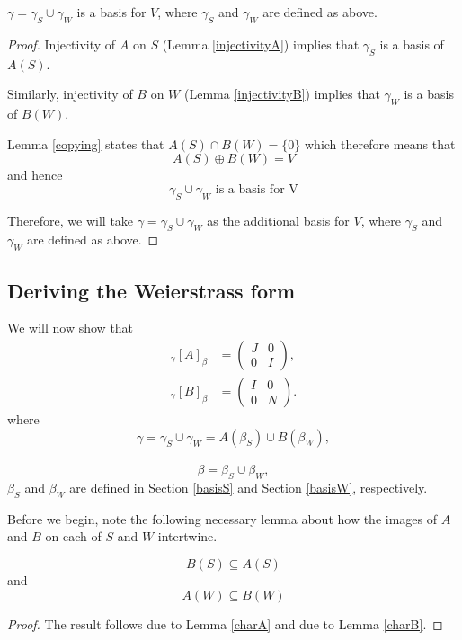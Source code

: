 \begin{lemma}
    $\gamma=\gamma_S\cup \gamma_W$ is a basis for $V$, where  $\gamma_S$ and $\gamma_W$ are defined as above.
\end{lemma}
\begin{proof}
    Injectivity of $A$ on $S$ (Lemma \ref{injectivityA}) implies that $\gamma_S$ is a basis of $A(S)$.
    
    Similarly, injectivity of $B$ on $W$ (Lemma \ref{injectivityB}) implies that $\gamma_W$ is a basis of $B(W)$.
    
    Lemma \ref{copying} states that $A(S)\cap B(W)=\{0\}$ which therefore means that $$A(S)\oplus B(W)=V$$and hence $$\gamma_S\cup \gamma_W\text{ is a basis for V}$$

Therefore, we will take $\gamma=\gamma_S\cup \gamma_W$ as the additional basis for $V$, where $\gamma_S$ and $\gamma_W$ are defined as above.

    

\end{proof}
\subsection{Deriving the Weierstrass form}
We will now show that
\begin{equation}\label{weierstrass}
\begin{aligned}
{}_{\gamma}[A]_{\beta}
&=
\begin{pmatrix}
J & 0\\
0 & I
\end{pmatrix},
\\[1em]
{}_{\gamma}[B]_{\beta}
&=
\begin{pmatrix}
I & 0\\
0 & N
\end{pmatrix}.
\end{aligned}
\end{equation}
where $$\gamma = \gamma_S\cup \gamma_W=A(\beta_S)\cup B(\beta_W),$$ \\
$$\beta=\beta_S\cup \beta_W,$$
$\beta_S$ and $\beta_W$ are defined in Section \ref{basisS} and Section \ref{basisW}, respectively.

Before we begin, note the following necessary lemma about how the images of $A$ and $B$ on each of $S$ and $W$ intertwine.
\begin{lemma}
    \begin{equation}\label{incl1}
    B(S)\subseteq A(S)
\end{equation} 
and 
\begin{equation}\label{incl2}
    A(W)\subseteq B(W)
\end{equation}
\end{lemma}
\begin{proof}
   The result follows due to Lemma \ref{charA} and due to Lemma \ref{charB}.
\end{proof}


